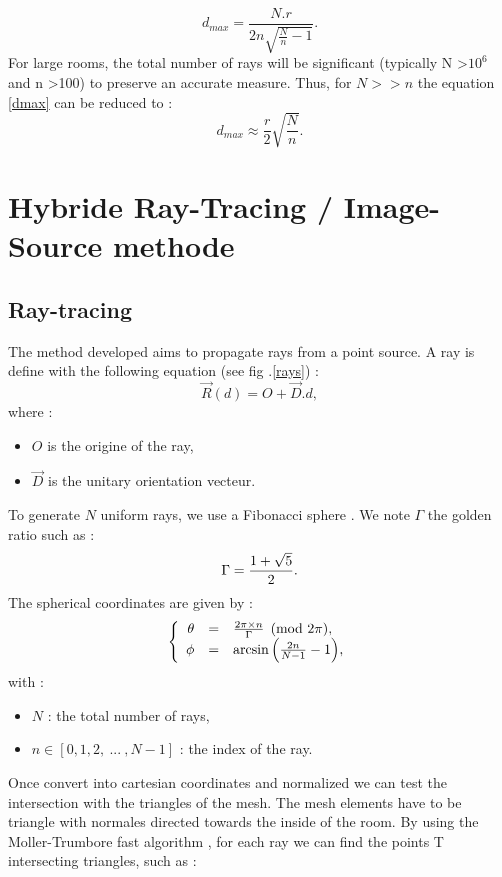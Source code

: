 \documentclass[AMA,STIX1COL]{WileyNJD-v2}
\begin{document}
\begin{equation} \label{dmax}
	d_{max} =  \frac{N.r}{2n\sqrt{\frac{N}{n}-1}}.
\end{equation}
%
For large rooms, the total number of rays will be significant (typically N >$10^6$ and n >100) to preserve an accurate measure. Thus, for $N>>n$ the equation \ref{dmax} can be reduced to :
\begin{equation}
	d_{max} \approx  \frac{r}{2}\sqrt{\frac{N}{n}}.
\end{equation}




\section{Hybride Ray-Tracing / Image-Source methode}\label{sec3}
\subsection{Ray-tracing \cite{raytracing}}

The method developed aims to propagate rays from a point source. A ray is define with the following equation (see fig .\ref{rays}) :
\begin{equation}
\overrightarrow{R}(d) = O + \overrightarrow{D}.d,
\end{equation}
where :
\begin{itemize}
\item $O$ is the origine of the ray,
\item $\overrightarrow{D}$ is the unitary orientation vecteur.
\end{itemize}

To generate $N$ uniform rays, we use a Fibonacci sphere \cite{fibonacci}. We note $\Gamma$ the golden ratio such as :
\begin{equation}
\Gamma = \frac{1 + \sqrt{5}}{2}. \\
\end{equation}
%
The spherical coordinates are given by :
\begin{equation}
  \left \{
   \begin{array}{r c l}
\theta &=& \frac{2 \pi \times n}{\Gamma}  \pmod{2\pi},  \\
\phi &=& \arcsin{\left(\frac{2n}{N-1}-1\right)}, 
   \end{array}
   \right .
\end{equation}
%
with : 
\begin{itemize}
\item $N$ : the total number of rays,
\item $n \in[0, 1, 2, \ ... \ ,N-1]$ : the index of the ray.
\end{itemize}
%
Once convert into cartesian coordinates and normalized we can test the intersection with the triangles of the mesh. The mesh elements have to be triangle with normales directed towards the inside of the room. By using the Moller-Trumbore fast algorithm \cite{moller}, for  each ray we can find the points T intersecting triangles, such as :
\end{document}
